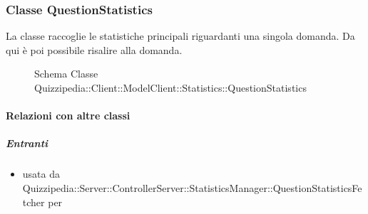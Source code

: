 \subsubsection{Classe QuestionStatistics}
La classe raccoglie le statistiche principali riguardanti una singola domanda. Da qui è poi possibile risalire alla domanda.
\begin{figure}[H]
\centering
\noindent{}
\caption[Schema Classe QuestionStatistics]{Schema Classe Quizzipedia::Client::ModelClient::Statistics::QuestionStatistics}
\end{figure}
\paragraph{Relazioni con altre classi}
\subparagraph{Entranti}
\begin{itemize}
\item usata da Quizzipedia::Server::ControllerServer::StatisticsManager::QuestionStatisticsFetcher per 
\end{itemize}
